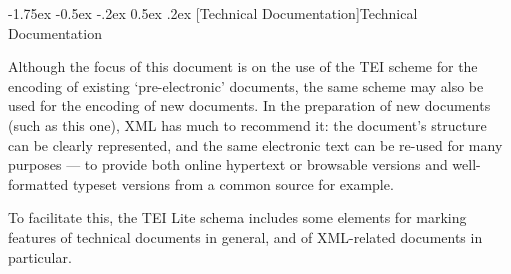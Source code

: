 \documentclass[11pt,twoside]{article}\makeatletter
\makeatletter
\renewcommand\section{\@startsection {section}{1}{\z@}%
     {-1.75ex \@plus -0.5ex \@minus -.2ex}%
     {0.5ex \@plus .2ex}%
     {\reset@font\Large\bfseries\sffamily}}
\makeatother
\begin{document}
\section[{Technical Documentation}]{Technical Documentation}\label{U5-techdoc}\par
Although the focus of this document is on the use of the TEI scheme for the encoding of existing ‘pre-electronic’ documents, the same scheme may also be used for the encoding of new documents. In the preparation of new documents (such as this one), XML has much to recommend it: the document's structure can be clearly represented, and the same electronic text can be re-used for many purposes — to provide both online hypertext or browsable versions and well-formatted typeset versions from a common source for example.\par
To facilitate this, the TEI Lite schema includes some elements for marking features of technical documents in general, and of XML-related documents in particular.
\end{document}
